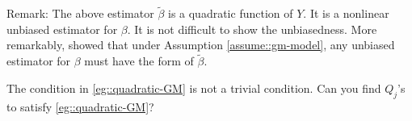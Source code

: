 Remark: The above estimator $\tilde\beta $ is a quadratic function of $Y$. It is a nonlinear unbiased estimator for $\beta$. It is not difficult to show the unbiasedness. More remarkably, \citet[][Theorem 4.3]{koopmann1982parameterschatzung} showed that under Assumption \ref{assume::gm-model}, any unbiased estimator for $\beta$ must have the form of $\tilde\beta $.

The condition in \eqref{eg::quadratic-GM} is not a trivial condition. Can you find $Q_j$'s to satisfy \eqref{eg::quadratic-GM}?

